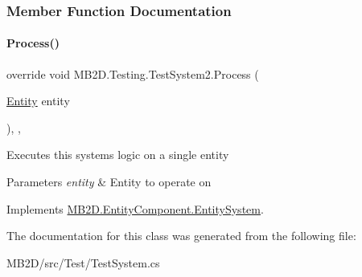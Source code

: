 \subsubsection{Member Function Documentation}
\hypertarget{class_m_b2_d_1_1_testing_1_1_test_system2_a0fbdd06fd0de796cfec32b7e025f73fe}{}\label{class_m_b2_d_1_1_testing_1_1_test_system2_a0fbdd06fd0de796cfec32b7e025f73fe} 
\paragraph{\texorpdfstring{Process()}{Process()}}
{\footnotesize\ttfamily override void M\+B2\+D.\+Testing.\+Test\+System2.\+Process (\begin{DoxyParamCaption}\item[{\hyperlink{class_m_b2_d_1_1_entity_component_1_1_entity}{Entity}}]{entity }\end{DoxyParamCaption})\hspace{0.3cm}{\ttfamily [inline]}, {\ttfamily [protected]}, {\ttfamily [virtual]}}



Executes this systems logic on a single entity 


\begin{DoxyParams}{Parameters}
{\em entity} & Entity to operate on\\
\hline
\end{DoxyParams}


Implements \hyperlink{class_m_b2_d_1_1_entity_component_1_1_entity_system_abbf83b87cb5d12754fb058cef50451fa}{M\+B2\+D.\+Entity\+Component.\+Entity\+System}.



The documentation for this class was generated from the following file\+:\begin{DoxyCompactItemize}
\item 
M\+B2\+D/src/\+Test/Test\+System.\+cs\end{DoxyCompactItemize}
